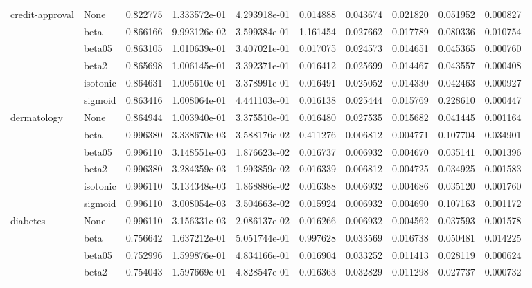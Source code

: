 \begin{tabular}{llrrrrrrrr}
credit-approval & None &  0.822775 &  1.333572e-01 &  4.293918e-01 &   0.014888 &  0.043674 &  0.021820 &  0.051952 &  0.000827 \\
        & beta &  0.866166 &  9.993126e-02 &  3.599384e-01 &   1.161454 &  0.027662 &  0.017789 &  0.080336 &  0.010754 \\
        & beta05 &  0.863105 &  1.010639e-01 &  3.407021e-01 &   0.017075 &  0.024573 &  0.014651 &  0.045365 &  0.000760 \\
        & beta2 &  0.865698 &  1.006145e-01 &  3.392371e-01 &   0.016412 &  0.025699 &  0.014467 &  0.043557 &  0.000408 \\
        & isotonic &  0.864631 &  1.005610e-01 &  3.378991e-01 &   0.016491 &  0.025052 &  0.014330 &  0.042463 &  0.000927 \\
        & sigmoid &  0.863416 &  1.008064e-01 &  4.441103e-01 &   0.016138 &  0.025444 &  0.015769 &  0.228610 &  0.000447 \\
dermatology & None &  0.864944 &  1.003940e-01 &  3.375510e-01 &   0.016480 &  0.027535 &  0.015682 &  0.041445 &  0.001164 \\
        & beta &  0.996380 &  3.338670e-03 &  3.588176e-02 &   0.411276 &  0.006812 &  0.004771 &  0.107704 &  0.034901 \\
        & beta05 &  0.996110 &  3.148551e-03 &  1.876623e-02 &   0.016737 &  0.006932 &  0.004670 &  0.035141 &  0.001396 \\
        & beta2 &  0.996380 &  3.284359e-03 &  1.993859e-02 &   0.016339 &  0.006812 &  0.004725 &  0.034925 &  0.001583 \\
        & isotonic &  0.996110 &  3.134348e-03 &  1.868886e-02 &   0.016388 &  0.006932 &  0.004686 &  0.035120 &  0.001760 \\
        & sigmoid &  0.996110 &  3.008054e-03 &  3.504663e-02 &   0.015924 &  0.006932 &  0.004690 &  0.107163 &  0.001172 \\
diabetes & None &  0.996110 &  3.156331e-03 &  2.086137e-02 &   0.016266 &  0.006932 &  0.004562 &  0.037593 &  0.001578 \\
        & beta &  0.756642 &  1.637212e-01 &  5.051744e-01 &   0.997628 &  0.033569 &  0.016738 &  0.050481 &  0.014225 \\
        & beta05 &  0.752996 &  1.599876e-01 &  4.834166e-01 &   0.016904 &  0.033252 &  0.011413 &  0.028119 &  0.000624 \\
        & beta2 &  0.754043 &  1.597669e-01 &  4.828547e-01 &   0.016363 &  0.032829 &  0.011298 &  0.027737 &  0.000732 \\

\end{tabular}
